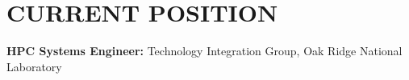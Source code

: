 \section{CURRENT POSITION}
\vspace{0.03in}
{\bf HPC Systems Engineer:} Technology Integration Group,
Oak Ridge National Laboratory

